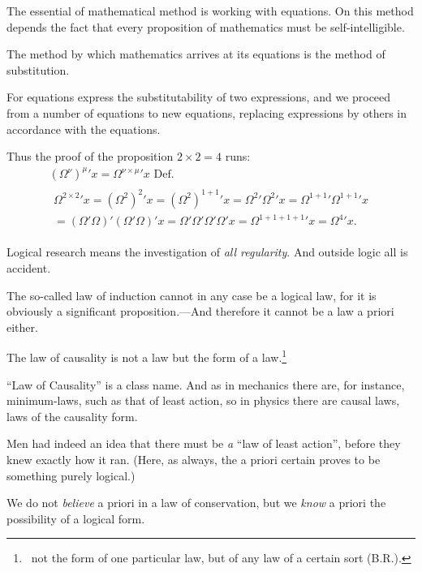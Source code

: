 {The essential of mathematical method is working
with equations. On this method depends the
fact that every proposition of mathematics must
be self-intelligible.}


{The method by which mathematics arrives at
its equations is the method of substitution.

For equations express the substitutability of
two expressions, and we proceed from a number
of equations to new equations, replacing expressions
by others in accordance with the
equations.}


{Thus the proof of the proposition $2 \times 2 = 4$ runs:
\begin{gather*}
(\Omega^{\nu})^{\mu}{}'x = \Omega^{\nu \times \mu}{}'x \text{ Def.}\\
\begin{split}
\Omega^{2 \times 2}{}'x = (\Omega^{2})^{2}{}'x = (\Omega^{2})^{1 + 1}{}'x = \Omega^{2}{}'\Omega^{2}{}'x = \Omega^{1 + 1}{}'\Omega^{1 + 1}{}'x\\
= (\Omega'\Omega)'(\Omega'\Omega)'x = \Omega'\Omega'\Omega'\Omega'x = \Omega^{1 + 1 + 1 + 1}{}'x = \Omega^{4}{}'x.
\end{split}
\end{gather*}}


{Logical research means the investigation of \emph{all
\enlargethispage{2pt} %
regularity}. And outside logic all is accident.}


{The so-called law of induction cannot in any
case be a logical law, for it is obviously a significant
proposition.---And therefore it cannot be
a law a priori either.}


{The law of causality is not a law but the form
of a law.\footnote{\IdEst\ not the form of one particular law, but of any law of a certain
sort (B.\;R.).}}


{``Law of Causality'' is a class name. And as
in mechanics there are, for instance, minimum-laws,
such as that of least action, so in physics
there are causal laws, laws of the causality
form.}


{Men had indeed an idea that there must be
\emph{a} ``law of least action'', before they knew
exactly how it ran. (Here, as always, the a
priori certain proves to be something purely
logical.)}


{We do not \emph{believe} a priori in a law of conservation,
but we \emph{know} a priori the possibility of
a logical form.}


